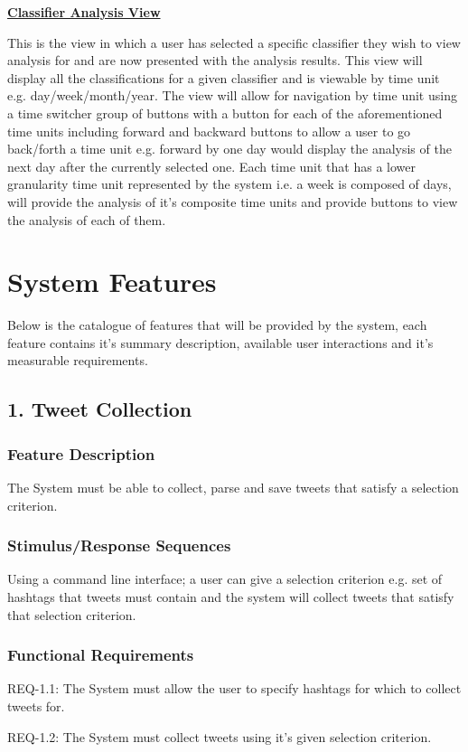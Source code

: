 \documentclass[11pt]{report}
\begin{document}
\textbf{\underline{Classifier Analysis View}}

This is the view in which a user has selected a specific classifier they wish to view analysis for and are now presented with the analysis results. This view will display all the classifications for a given classifier and is viewable by time unit e.g. day/week/month/year. The view will allow for navigation by time unit using a time switcher group of buttons with a button for each of the aforementioned time units including forward and backward buttons to allow a user to go back/forth a time unit e.g. forward by one day would display the analysis of the next day after the currently selected one. Each time unit that has a lower granularity time unit represented by the system i.e. a week is composed of days, will provide the analysis of it's composite time units and provide buttons to view the analysis of each of them.

\clearpage
\section*{System Features}
Below is the catalogue of features that will be provided by the system, each feature contains it's summary description, available user interactions and it's measurable requirements.

\subsection*{1. Tweet Collection}
\subsubsection*{Feature Description}
The System must be able to collect, parse and save tweets that satisfy a selection criterion.
\subsubsection*{Stimulus/Response Sequences}
Using a command line interface; a user can give a selection criterion e.g. set of hashtags that tweets must contain and the system will collect tweets that satisfy that selection criterion.
\subsubsection*{Functional Requirements}
REQ-1.1:	The System must allow the user to specify hashtags for which to collect tweets for.

REQ-1.2: The System must collect tweets using it's given selection criterion.
\end{document}

